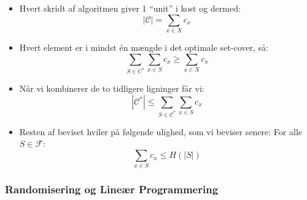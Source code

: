 \begin{frame}[allowframebreaks]
\begin{itemize}
	\item Hvert skridt af algoritmen giver 1 ``unit'' i kost og dermed:
		  \begin{equation*}
			|\mathcal{C}| = \sum_{x \in X} c_{x}
		  \end{equation*}
	\item Hvert element er i mindst én mængde i det optimale set-cover, så:
		  \begin{equation*}
			\sum_{S \in C^{*}} \sum_{x \in S} c_{x} \ge \sum_{x \in X} c_{x}
		  \end{equation*}
	\item Når vi kombinerer de to tidligere ligninger får vi:
		  \begin{equation*}
			|\mathcal{C}^{*}| \le \sum_{S \in \mathcal{C}^{*}} \sum_{x \in S}  c_{x}
		  \end{equation*}
	\item Resten af beviset hviler på følgende ulighed, som vi beviser senere: For alle $S \in \mathcal{F}$:
		  \begin{equation*}
			\sum_{x \in S} c_{x} \le H(|S|)
		  \end{equation*}
  \end{itemize}
\end{frame}

\begin{frame}[allowframebreaks]
  \frametitle{Randomisering og Lineær Programmering}

\end{frame}


